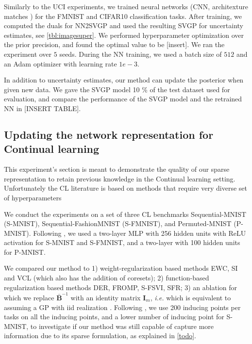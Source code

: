 \documentclass{article}
\makeatletter
\newcommand{\ie}{\textit{i.e.\@}\xspace}
\newcommand{\mbf}[1]{\mathbf{#1}}
\newcommand{\MB}{\mbf{B}}
\newcommand{\MI}{\mbf{I}}
\makeatother
\begin{document}
Similarly to the UCI experiments, we trained neural networks (CNN, architexture matches \citet{immer2021improving}) for the FMNIST and CIFAR10 classification tasks. After training, we computed the duals for NN2SVGP and used the resulting SVGP for uncertainty estimates, see \cref{tbl:imagesuper}. We performed hyperparameter optimization over the prior precision, and found the optimal value to be [insert]. We ran the experiment over $5$ seeds. During the NN training, we used a batch size of $512$ and an Adam optimizer with learning rate $1e-3$.

In addition to uncertainty estimates, our method can update the posterior when given new data. We gave the SVGP model 10 \% of the test dataset used for evaluation, and compare the performance of the SVGP model and the retrained NN in [INSERT TABLE]. 

\subsection{Updating the  network representation for Continual learning}
This experiment's section is meant to demonstrate the quality of our sparse representation to retain previous knowledge in the Continual learning setting. Unfortunately the CL literature is based on methods that require very diverse set of hyperparameters 


We conduct the experiments on a set of three CL benchmarks Sequential-MNIST (S-MNIST), Sequential-FashionMNIST (S-FMNIST), and Permuted-MNIST (P-MNIST).  Following \cite{rudner2022continual, pan2020continual}, we used a two-layer MLP with 256 hidden units with ReLU activation for S-MNIST and S-FMNIST, and a two-layer with 100 hidden units for P-MNIST. 

We compared our method to 1) weight-regularization based methods EWC, SI and VCL (which also has the addition of coresets); 2) function-based regularization based methods DER, FROMP, S-FSVI, SFR; 3) an ablation for which we replace $\bar{\MB}^{-1}$ with an identity matrix $\MI_m$, \ie which is equivalent to assuming a GP with iid realization .
Following \citep{rudner2022continual}, we use 200 inducing points per tasks %
on all the inducing points, and a lower number of inducing point for S-MNIST, to investigate if our method was still capable of capture more information due to its sparse formulation, as explained in \cref{todo}.
\end{document}
